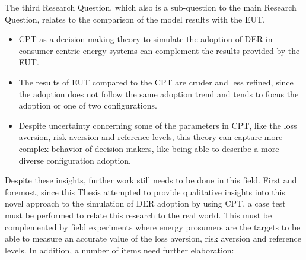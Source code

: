 The third Research Question, which also is a sub-question to the main Research Question, relates to the comparison of the model results with the EUT.
\begin{itemize}
\item  CPT as a decision making theory to simulate the adoption of DER in consumer-centric energy systems can complement the results provided by the EUT.
\item The results of EUT compared to the CPT are cruder and less refined, since the adoption does not follow the same adoption trend and tends to focus the adoption or one of two configurations. 
\item Despite uncertainty concerning some of the parameters in CPT, like the loss aversion, risk aversion and reference levels, this theory can capture more complex behavior of decision makers, like being able to describe a more diverse configuration adoption.
\end{itemize}
\newline \newline \noindent
Despite these insights, further work still needs to be done in this field. First and foremost, since this Thesis attempted to provide qualitative insights into this novel approach to the simulation of DER adoption by using CPT, a case test must be performed to relate this research to the real world. This must be complemented by field experiments where energy prosumers are the targets to be able to measure an accurate value of the loss aversion, risk aversion and reference levels. In addition, a number of items need further elaboration:
